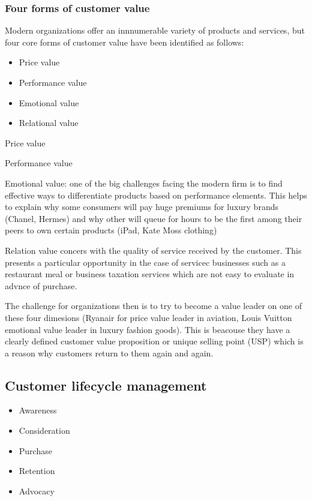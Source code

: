 \documentclass{article}
\begin{document}
\subsubsection*{Four forms of customer value}
Modern organizations offer an innnumerable variety of products and services, but four core forms of customer value have been identified as follows: 

\begin{itemize}
    \item Price value
    \item Performance value
    \item Emotional value
    \item Relational value
\end{itemize}

Price value

Performance value

Emotional value: one of the big challenges facing the modern firm is to find effective ways to differentiate products based on performance elements. This helps to explain why some consumers will pay huge premiums for luxury brands (Chanel, Hermes) and why other will queue for hours to be the first among their peers to own certain products (iPad, Kate Moss clothing)

Relation value concers with the quality of service received by the customer. This presents a particular opportunity in the case of servicec businesses such as a restaurant meal or business taxation services which are not easy to evaluate in advnce of purchase.

The challenge for organizations then is to try to become a value leader on one of these four dimesions (Ryanair for price value leader in aviation, Louis Vuitton emotional value leader in luxury fashion goods). This is beacouse they have a clearly defined customer value proposition or unique selling point (USP) which is a reason why customers return to them again and again. 

\subsection{Customer lifecycle management}
\begin{itemize}
    \item Awareness
    \item Consideration
    \item Purchase
    \item Retention
    \item Advocacy
\end{itemize}
\end{document}

